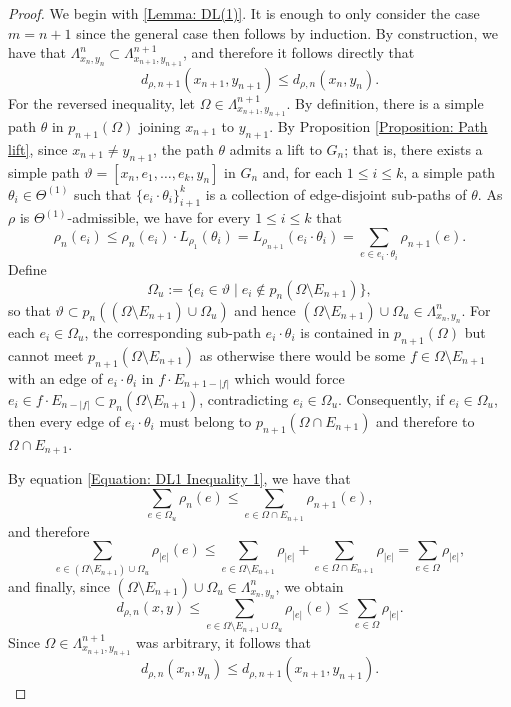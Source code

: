 \documentclass{amsart}
\numberwithin{equation}{section}
\theoremstyle{definition}
\theoremstyle{remark}
\begin{document}
\begin{proof}
    We begin with \ref{Lemma: DL(1)}. It is enough to only consider the case \(m=n+1\) since the general case then follows by induction. By construction, we have that \(\Lambda^n_{x_n,y_n}\subset\Lambda^{n+1}_{x_{n+1},y_{n+1}}\), and therefore it follows directly that
        \[
            d_{\rho,n+1}(x_{n+1},y_{n+1})\leq d_{\rho,n}(x_n,y_n).
        \]
    For the reversed inequality, let \(\Omega\in\Lambda^{n+1}_{x_{n+1},y_{n+1}}\). By definition, there is a simple path \(\theta\) in \(p_{n+1}(\Omega)\) joining \(x_{n+1}\) to \(y_{n+1}\). By Proposition \ref{Proposition: Path lift}, since \(x_{n+1}\neq y_{n+1}\), the path \(\theta\) admits a lift to \(G_n\); that is, there exists a simple path \(\vartheta=[x_n,e_1,\ldots,e_k,y_n]\) in \(G_n\) and, for each \(1\leq i\leq k\), a simple path \(\theta_i\in\Theta^{(1)}\) such that \(\{e_i\cdot\theta_i\}_{i+1}^k\) is a collection of edge-disjoint sub-paths of \(\theta\). As \(\rho\) is \(\Theta^{(1)}\)-admissible, we have for every \(1\leq i\leq k\) that
        \begin{equation}\label{Equation: DL1 Inequality 1}
            \rho_n(e_i)\leq \rho_n(e_i)\cdot L_{\rho_1}(\theta_i)=L_{\rho_{n+1}}(e_i\cdot\theta_i)=\sum_{e\in e_i\cdot\theta_i}\rho_{n+1}(e).
        \end{equation}
    Define
        \[
            \Omega_u:=\{e_i\in\vartheta\mid e_i\not\in p_n(\Omega \setminus E_{n+1})\},
        \]
    so that \(\vartheta\subset p_n((\Omega \setminus E_{n+1}) \cup\Omega_u)\) and hence \((\Omega \setminus E_{n+1}) \cup\Omega_u \in\Lambda^n_{x_n,y_n}\). For each \(e_i\in\Omega_u\), the corresponding sub-path \(e_i\cdot\theta_i\) is contained in \(p_{n+1}(\Omega)\) but cannot meet \(p_{n+1}(\Omega \setminus E_{n+1})\) as otherwise there would be some \(f\in\Omega \setminus E_{n+1}\) with an edge of \(e_i\cdot\theta_i\) in \(f\cdot E_{n+1-\lvert f\rvert}\) which would force \(e_i\in f\cdot E_{n-\lvert f\rvert}\subset  p_n(\Omega \setminus E_{n+1})\), contradicting \(e_i\in\Omega_u\). Consequently, if \(e_i\in\Omega_u\), then every edge of \(e_i\cdot\theta_i\) must belong to \(p_{n+1}(\Omega\cap E_{n+1})\) and therefore to \(\Omega \cap E_{n+1}\). 
    
    By equation \eqref{Equation: DL1 Inequality 1}, we have that
        \[
            \sum_{e\in\Omega_u}\rho_n(e)\leq \sum_{e\in \Omega \cap E_{n+1}}\rho_{n+1}(e),
        \]
    and therefore
        \[
            \sum_{e\in(\Omega \setminus E_{n+1}) \cup\Omega_u}\rho_{\lvert e\rvert}(e)\leq \sum_{e\in\Omega \setminus E_{n+1}}\rho_{\lvert e\rvert}+\sum_{e\in\Omega\cap E_{n+1}}\rho_{\lvert e\rvert} =\sum_{e\in\Omega}\rho_{\lvert e\rvert},
        \]
    and finally, since \((\Omega \setminus E_{n+1})\cup\Omega_u\in\Lambda^n_{x_n,y_n}\), we obtain
        \[
            d_{\rho,n}(x,y)\leq\sum_{e\in \Omega \setminus E_{n+1}\cup\Omega_u}\rho_{\lvert e\rvert }(e)\leq \sum_{e\in\Omega}\rho_{\lvert e\rvert}.
        \]
    Since \(\Omega\in\Lambda^{n+1}_{x_{n+1},y_{n+1}}\) was arbitrary, it follows that
        \[
            d_{\rho,n}(x_n,y_n)\leq d_{\rho,n+1}(x_{n+1},y_{n+1}).
        \]


\end{proof}
\end{document}
